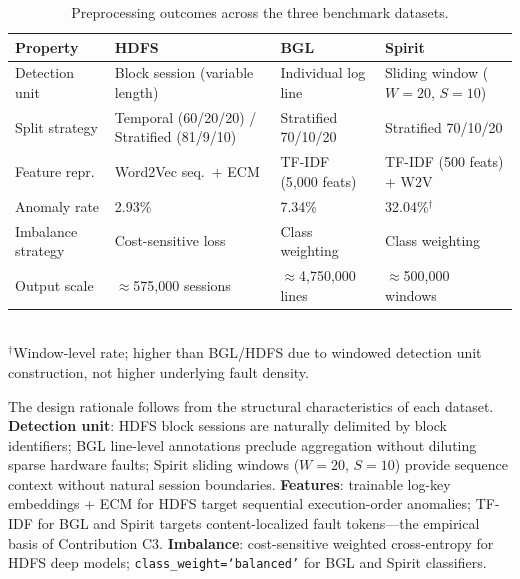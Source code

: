 \documentclass{elektr}
\begin{document}
\begin{table}[h!]
\caption{Preprocessing outcomes across the three benchmark datasets.}
\begin{center}
\small
\begin{tabular}{|p{2.0cm}|p{3.6cm}|p{3.6cm}|p{3.6cm}|}
\hline
\textbf{Property} & \textbf{HDFS} & \textbf{BGL} & \textbf{Spirit} \\
\hline
Detection unit &
Block session (variable length) &
Individual log line &
Sliding window ($W{=}20$, $S{=}10$) \\
\hline
Split strategy &
Temporal (60/20/20) / Stratified (81/9/10) &
Stratified 70/10/20 &
Stratified 70/10/20 \\
\hline
Feature repr. &
Word2Vec seq.\ + ECM &
TF-IDF (5{,}000 feats) &
TF-IDF (500 feats) + W2V \\
\hline
Anomaly rate &
2.93\% &
7.34\% &
32.04\%$^\dagger$ \\
\hline
Imbalance strategy &
Cost-sensitive loss &
Class weighting &
Class weighting \\
\hline
Output scale &
$\approx$575{,}000 sessions &
$\approx$4{,}750{,}000 lines &
$\approx$500{,}000 windows \\
\hline
\end{tabular}
\label{tab:preprocessing}
\smallskip\\
{\footnotesize $^\dagger$Window-level rate; higher than BGL/HDFS due to windowed
detection unit construction, not higher underlying fault density.}
\end{center}\vs{-4mm}
\end{table}

The design rationale follows from the structural characteristics of each dataset.
\textbf{Detection unit}: HDFS block sessions are naturally delimited by block
identifiers; BGL line-level annotations preclude aggregation without diluting
sparse hardware faults; Spirit sliding windows ($W{=}20$, $S{=}10$) provide
sequence context without natural session boundaries.
\textbf{Features}: trainable log-key embeddings + ECM for HDFS target
sequential execution-order anomalies; TF-IDF for BGL and Spirit targets
content-localized fault tokens---the empirical basis of Contribution C3.
\textbf{Imbalance}: cost-sensitive weighted cross-entropy for HDFS deep models;
\texttt{class\_weight=`balanced'} for BGL and Spirit classifiers.
\end{document}
